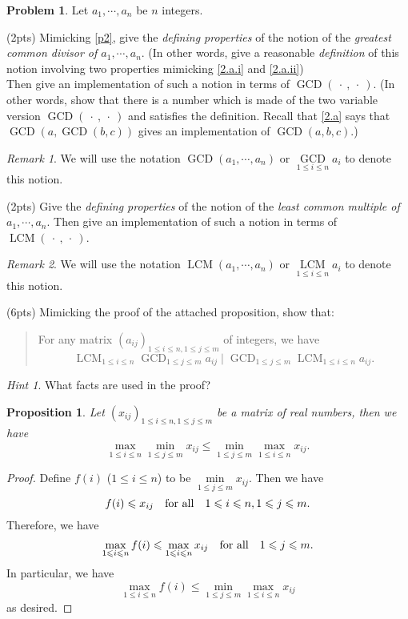 \documentclass[11pt]{article}
\theoremstyle{plain}
\newtheorem*{propstar}{Proposition}
\theoremstyle{definition}
\newtheorem{problem}{Problem}
\theoremstyle{remark}
\newtheorem*{remark}{Remark}
\newtheorem*{hint}{Hint}
\numberwithin{equation}{problem}
\DeclareMathOperator*\GCD{GCD}
\DeclareMathOperator*\LCM{LCM}
\begin{document}
\begin{problem}
	Let $a_1,\cdots,a_n$ be $n$ integers. 
	\begin{listinprob}
		\item (2pts) Mimicking \cref{p2}, give the \emph{defining properties} of the notion of the \emph{greatest common divisor of $a_1,\cdots,a_n$}. (In other words, give a reasonable \emph{definition} of this notion involving two properties mimicking \ref{2.a.i} and \ref{2.a.ii}) \\
		Then give an implementation of such a notion in terms of $\GCD(\:\cdot\:,\:\cdot\:)$. (In other words, show that there is a number which is made of the two variable version $\GCD(\:\cdot\:,\:\cdot\:)$ and satisfies the definition. Recall that \cref{2.a} says that $\GCD(a,\GCD(b, c))$ gives an implementation of $\GCD(a, b, c)$.)
		
		\begin{remark}
			We will use the notation $\GCD(a_1,\cdots,a_n)$ or $\GCD\limits_{1\le i\le n}a_i$ to denote this notion.
		\end{remark}

		\item (2pts) Give the \emph{defining properties} of the notion of the \emph{least common multiple of $a_1,\cdots,a_n$}. Then give an implementation of such a notion in terms of $\LCM(\:\cdot\:,\:\cdot\:)$. 
		
		\begin{remark}
			We will use the notation $\LCM(a_1,\cdots,a_n)$ or $\LCM\limits_{1\le i\le n}a_i$ to denote this notion.
		\end{remark}

		\item (6pts) Mimicking the proof of the attached proposition, show that: 
		\begin{quote}
			For any matrix $(a_{ij})_{1\le i\le n, 1\le j\le m}$ of integers, we have 
			\[
				\LCM_{1\le i\le n}\GCD_{1\le j\le m} a_{ij} \mid 
				\GCD_{1\le j\le m}\LCM_{1\le i\le n} a_{ij}.
			\]
		\end{quote}
		\begin{hint}
			What facts are used in the proof?
		\end{hint}
	\end{listinprob}
	\begin{tcolorbox}
		\begin{propstar}\label{prop}
			Let $(x_{ij})_{1\le i\le n, 1\le j\le m}$ be a matrix of real numbers, then we have 
			\[
				\max_{1\le i\le n}\min_{1\le j\le m} x_{ij} \le 
				\min_{1\le j\le m}\max_{1\le i\le n} x_{ij}.
			\]
		\end{propstar}
		\begin{proof}
			Define $f(i)$ ($1\le i\le n$) to be $\min\limits_{1\le j\le m}x_{ij}$. Then we have 
			\[
				f(i) \leqslant x_{ij} \quad\text{for all}\quad 1\leqslant i\leqslant n, 1\leqslant j\leqslant m.
			\]
			Therefore, we have 
			\[
				\max_{1\leqslant i\leqslant n}f(i) \leqslant \max_{1\leqslant i\leqslant n} x_{ij} 
				\quad\text{for all}\quad 1\leqslant j\leqslant m.
			\]
			In particular, we have 
			\[
				\max_{1\le i\le n}f(i) \le \min_{1\le j\le m}\max_{1\le i\le n} x_{ij}
			\]
			as desired.
		\end{proof}
	\end{tcolorbox}
\end{problem}
\end{document}
